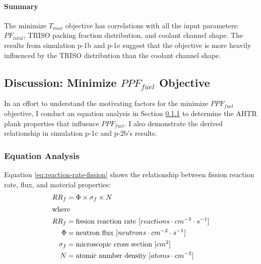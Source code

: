 \paragraph{Summary}
The minimize $T_{max}$ objective has correlations with all the input parameters: 
$PF_{total}$, TRISO packing fraction distribution, and coolant channel shape. 
The results from simulation p-1b and p-1e suggest that the objective is more heavily 
influenced by the TRISO distribution than the coolant channel shape. 

\subsection{Discussion: Minimize $PPF_{fuel}$ Objective}
\label{sec:plank-discussion-ppf}
In an effort to understand the motivating factors for the minimize $PPF_{fuel}$ 
objective, I conduct an equation analysis in Section
\ref{sec:plank-discussion-ppf-equation} to determine the \gls{AHTR} plank properties 
that influence $PPF_{fuel}$. 
I also demonstrate the derived relationship in simulation p-1c and p-2b's results. 

\subsubsection{Equation Analysis}
\label{sec:plank-discussion-ppf-equation}
Equation \ref{eq:reaction-rate-fission} shows the relationship between fission reaction 
rate, flux, and material properties: 
\begin{align}
\label{eq:reaction-rate-fission}
    RR_f &= \Phi \times \sigma_f \times N \\
\intertext{where}
    RR_f &= \mbox{fission reaction rate } [reactions \cdot cm^{-3} \cdot s^{-1}] \nonumber \\
    \Phi &= \mbox{neutron flux } [neutrons \cdot cm^{-2} \cdot s^{-1}] \nonumber \\
    \sigma_f &= \mbox{microscopic cross section } [cm^2] \nonumber \\
    N &= \mbox{atomic number density } [atoms \cdot cm^{-3}] \nonumber 
\end{align}

